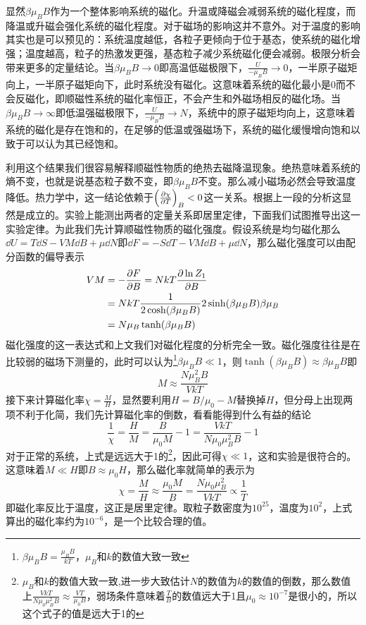 \documentclass[../../main.tex]{subfiles}
\begin{document}
显然\(\beta \mu_BB\)作为一个整体影响系统的磁化。升温或降磁会减弱系统的磁化程度，而降温或升磁会强化系统的磁化程度。对于磁场的影响这并不意外。对于温度的影响其实也是可以预见的：系统温度越低，各粒子更倾向于位于基态，使系统的磁化增强；温度越高，粒子的热激发更强，基态粒子减少系统磁化便会减弱。极限分析会带来更多的定量结论。当\(\beta \mu_BB\to 0\)即高温低磁极限下，\(\frac{U}{-\mu_BB}\to0\)，一半原子磁矩向上，一半原子磁矩向下，此时系统没有磁化。这意味着系统的磁化最小是0而不会反磁化，即顺磁性系统的磁化率恒正，不会产生和外磁场相反的磁化场。当\(\beta \mu_BB\to \infty\)即低温强磁极限下，\(\frac{U}{-\mu_BB}\to N\)，系统中的原子磁矩均向上，这意味着系统的磁化是存在饱和的，在足够的低温或强磁场下，系统的磁化缓慢增向饱和以致于可以认为其已经饱和。

利用这个结果我们很容易解释顺磁性物质的绝热去磁降温现象。绝热意味着系统的熵不变，也就是说基态粒子数不变，即\(\beta \mu_BB\)不变。那么减小磁场必然会导致温度降低。热力学中，这一结论依赖于\(\left(\pdv{\chi}{T}\right)_B<0\)这一关系。根据上一段的分析这显然是成立的。实验上能测出两者的定量关系即居里定律，下面我们试图推导出这一实验定律。为此我们先计算顺磁性物质的磁化强度。假设系统是均匀磁化那么\(\dd U=T\dd S-VM\dd B+\mu\dd N\)即\(\dd F=-S\dd T-VM\dd B+\mu\dd N\)，那么磁化强度可以由配分函数的偏导表示
\begin{equation}
    \begin{split}
        VM&=-\pdv{F}{B}=NkT\pdv{\ln Z_1}{B} \\
        &=NkT\frac{1}{2\cosh(\beta\mu_BB)}2\sinh(\beta\mu_BB)\beta\mu_B \\
        &=N\mu_B\tanh(\beta\mu_BB)
    \end{split}
\end{equation}
磁化强度的这一表达式和上文我们对磁化程度的分析完全一致。磁化强度往往是在比较弱的磁场下测量的，此时可以认为\footnote{\(\beta\mu_BB=\frac{\mu_BB}{kT}\)，\(\mu_B\)和\(k\)的数值大致一致}\(\beta\mu_BB\ll 1\)，则\(\tanh(\beta\mu_BB)\approx\beta\mu_BB\)即
\begin{equation}
    M\approx\frac{N\mu_B^2B}{VkT}
\end{equation}
接下来计算磁化率\(\chi=\frac{M}{H}\)，显然要利用\(H=B/\mu_0-M\)替换掉\(H\)，但分母上出现两项不利于化简，我们先计算磁化率的倒数，看看能得到什么有益的结论
\begin{equation} 
    \frac{1}{\chi}=\frac{H}{M}=\frac{B}{\mu_0M}-1=\frac{VkT}{N\mu_0\mu_B^2B}-1
\end{equation}
对于正常的系统，上式是远远大于1的\footnote{\(\mu_B\)和\(k\)的数值大致一致,进一步大致估计\(N\)的数值为\(k\)的数值的倒数，那么数值上\(\frac{VkT}{N\mu_0\mu_B^2B}\approx\frac{VT}{\mu_0B}\)，弱场条件意味着\(\frac{T}{B}\)的数值远大于1且\(\mu_0\approx 10^{-7}\)是很小的，所以这个式子的值是远大于1的}，因此可得\(\chi\ll 1\)，这和实验是很符合的。这意味着\(M\ll H\)即\(B\approx\mu_0H\)，那么磁化率就简单的表示为
\begin{equation}
    \chi=\frac{M}{H}\approx\frac{\mu_0M}{B}=\frac{N\mu_0\mu_B^2}{VkT}\propto \frac{1}{T}
\end{equation}
即磁化率反比于温度，这正是居里定律。取粒子数密度为\(10^{25}\)，温度为\(10^2\)，上式算出的磁化率约为\(10^{-6}\)，是一个比较合理的值。
\end{document}
